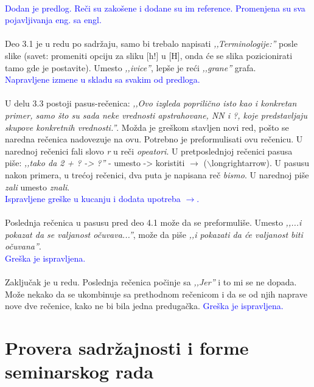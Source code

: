 \documentclass[a4paper]{report}
\newcommand{\odgovor}[1]{\textcolor{blue}{#1}}
\begin{document}
\\
\odgovor{Dodan je predlog. Reči su zakošene i dodane su im reference. Promenjena su sva pojavljivanja eng. sa engl.}
\\
\\
Deo 3.1 je u redu po sadržaju, samo bi trebalo napisati \textit{‚‚Terminologije:''} posle slike (savet: promeniti opciju za sliku [h!] u [H], onda će se slika pozicionirati tamo gde je postavite). Umesto \textit{‚‚ivice''}, lepše je reći \textit{‚‚grane''} grafa.
\\
\odgovor{Napravljene izmene u skladu sa svakim od predloga.}
\\
\\
U delu 3.3 postoji pasus-rečenica: \textit{‚‚Ovo izgleda poprilično isto kao i konkretan primer, samo što su sada neke vrednosti apstrahovane, NN i ?, koje predstavljaju skupove konkretnih vrednosti.''}. Možda je greškom stavljen novi red, pošto se naredna rečenica nadovezuje na ovu. Potrebno je preformulisati ovu rečenicu. U narednoj rečenici fali slovo \textit{r} u reči \textit{opeatori}. U pretposlednjoj rečenici pasusa piše: \textit{‚‚tako da 2 + ? -> ?''} - umesto -> koristiti $\longrightarrow$ ($\backslash$longrightarrow). U pasusu nakon primera, u trećoj rečenici, dva puta je napisana reč \textit{bismo}. U narednoj piše \textit{zali} umesto \textit{znali}.
\\
\odgovor{Ispravljene greške u kucanju i dodata upotreba \texttt{$\longrightarrow$}.}
\\
\\ 
Poslednja rečenica u pasusu pred deo 4.1 može da se preformuliše. Umesto \textit{‚‚...i pokazat da se valjanost očuvava...''}, može da piše \textit{‚‚i pokazati da će valjanost biti očuvana''}.
\\
\odgovor{Greška je ispravljena.}
\\
\\
Zaključak je u redu. Poslednja rečenica počinje sa \textit{‚‚Jer''} i to mi se ne dopada. Može nekako da se ukombinuje sa prethodnom rečenicom i da se od njih naprave nove dve rečenice, kako ne bi bila jedna predugačka.
\odgovor{Greška je ispravljena.}
\\

\section{Provera sadržajnosti i forme seminarskog rada}
\end{document}

